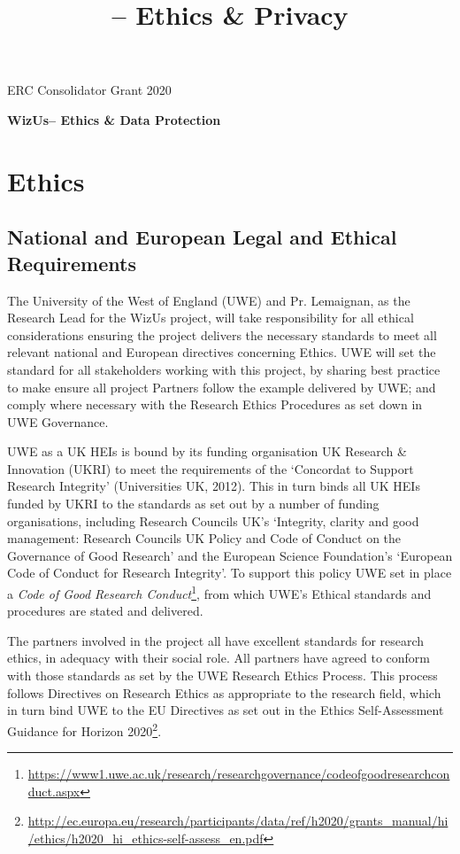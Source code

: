 \documentclass[11pt,a4paper]{report}
\title{\project -- Ethics \& Privacy}
\newcommand{\project}{WizUs\xspace}
\begin{document}
\begin{center}
    ERC Consolidator Grant 2020

    \vspace{2cm}

    \textbf{\LARGE \project -- Ethics \& Data Protection}

    \vspace{2cm}

\end{center}

\section{Ethics}

\subsection{National and European Legal and Ethical Requirements}

The University of the West of England (UWE) and Pr. Lemaignan,  as the Research
Lead for the \project project, will take responsibility for all ethical
considerations ensuring the project delivers the necessary standards to meet all
relevant national and European directives concerning Ethics. UWE will set the
standard for all stakeholders working with this project, by sharing best
practice to make ensure all project Partners follow the example delivered by
UWE; and comply where necessary with the Research Ethics Procedures as set down
in UWE Governance. 

UWE as a UK HEIs is bound by its funding organisation UK Research \& Innovation
(UKRI) to meet the requirements of the `Concordat to Support Research Integrity'
(Universities UK, 2012). This in turn binds all UK HEIs funded by UKRI to the
standards as set out by a number of funding organisations, including Research
Councils UK's `Integrity, clarity and good management: Research Councils UK
Policy and Code of Conduct on the Governance of Good Research' and the European
Science Foundation's `European Code of Conduct for Research Integrity'.  To
support this policy UWE set in place a \emph{Code of Good Research
Conduct}\footnote{\url{https://www1.uwe.ac.uk/research/researchgovernance/codeofgoodresearchconduct.aspx}}, from which
UWE's Ethical standards and procedures are stated and delivered.

\vspace{2em}

The partners involved in the project all have excellent standards for research
ethics, in adequacy with their social role.  All partners have agreed to conform
with those standards as set by the UWE Research Ethics Process.  This process
follows Directives on Research Ethics as appropriate to the research field,
which in turn bind UWE to the EU Directives as set out in the Ethics
Self-Assessment Guidance for Horizon 2020\footnote{\url{http://ec.europa.eu/research/participants/data/ref/h2020/grants_manual/hi/ethics/h2020_hi_ethics-self-assess_en.pdf}}.
\end{document}
